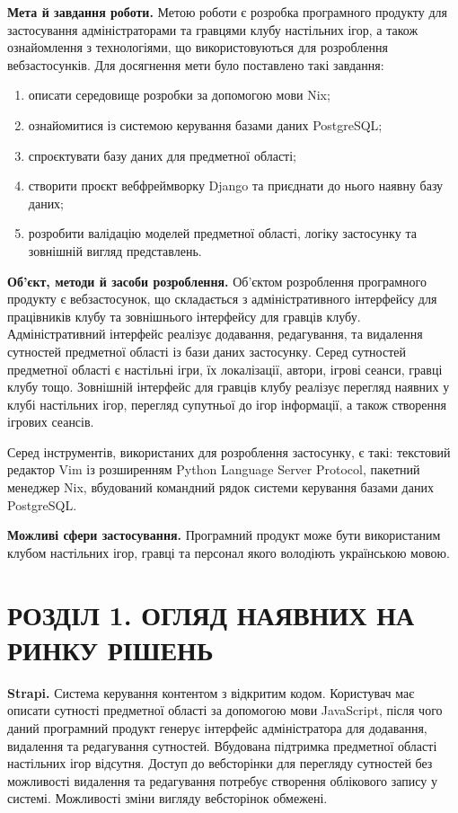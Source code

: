 \documentclass[a4paper, 14pt]{extarticle}
\begin{document}
  \textbf{Мета й завдання роботи.}
  Метою роботи є розробка програмного продукту для застосування адміністраторами
  та гравцями клубу настільних ігор, а також ознайомлення з технологіями, що
  використовуються для розроблення вебзастосунків. Для досягнення мети було поставлено
  такі завдання:

  \begin{enumerate}[nosep, label=\arabic*)]
    \item описати середовище розробки за допомогою мови Nix;
    \item ознайомитися із системою керування базами даних PostgreSQL;
    \item спроєктувати базу даних для предметної області;
    \item створити проєкт вебфреймворку Django та приєднати до нього наявну базу даних;
    \item розробити валідацію моделей предметної області, логіку застосунку та зовнішній
      вигляд представлень.
  \end{enumerate}

  \textbf{Об’єкт, методи й засоби розроблення.}
  Об'єктом розроблення програмного продукту є вебзастосунок, що складається
  з адміністративного інтерфейсу для працівників клубу та зовнішнього інтерфейсу
  для гравців клубу. Адміністративний інтерфейс реалізує додавання, редагування,
  та видалення сутностей предметної області із бази даних застосунку. Серед
  сутностей предметної області є настільні ігри, їх локалізації, автори, ігрові сеанси,
  гравці клубу тощо. Зовнішній інтерфейс для гравців клубу реалізує перегляд наявних
  у клубі настільних ігор, перегляд супутньої до ігор інформації, а також створення
  ігрових сеансів.

  Серед інструментів, використаних для розроблення застосунку, є такі: текстовий редактор
  Vim із розширенням Python Language Server Protocol,
  пакетний менеджер Nix, вбудований командний рядок системи керування базами даних
  PostgreSQL.

  \textbf{Можливі сфери застосування.}
  Програмний продукт може бути використаним клубом настільних ігор, гравці та персонал
  якого володіють українською мовою.

  \clearpage
  \section{РОЗДІЛ 1. ОГЛЯД НАЯВНИХ НА РИНКУ РІШЕНЬ}
  \textbf{Strapi.} Система керування контентом з відкритим кодом.
  Користувач має описати сутності предметної області за допомогою мови JavaScript, після
  чого даний програмний продукт генерує інтерфейс адміністратора для додавання, видалення
  та редагування сутностей. Вбудована підтримка предметної області настільних ігор
  відсутня. Доступ до вебсторінки для перегляду сутностей без можливості видалення та
  редагування потребує створення облікового запису у системі. Можливості зміни вигляду
  вебсторінок обмежені.
\end{document}
